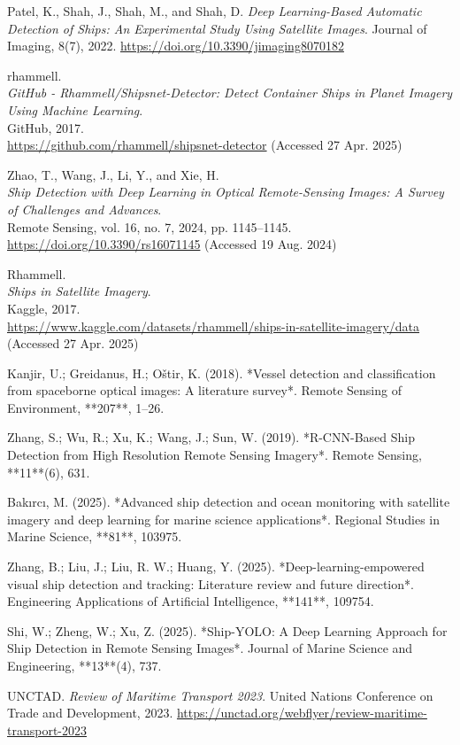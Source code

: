\documentclass[11pt]{article}
\begin{document}
	\newpage
	\begin{flushleft}
		\begin{thebibliography}{9}
			Patel, K., Shah, J., Shah, M., and Shah, D.
			\textit{Deep Learning-Based Automatic Detection of Ships: An Experimental Study Using Satellite Images}.
			Journal of Imaging, 8(7), 2022.
			\url{https://doi.org/10.3390/jimaging8070182}
			
			rhammell.\\
			\textit{GitHub - Rhammell/Shipsnet-Detector: Detect Container Ships in Planet Imagery Using Machine Learning}.\\
			GitHub, 2017.\\
			\url{https://github.com/rhammell/shipsnet-detector} (Accessed 27 Apr. 2025)
			
			Zhao, T., Wang, J., Li, Y., and Xie, H.\\
			\textit{Ship Detection with Deep Learning in Optical Remote-Sensing Images: A Survey of Challenges and Advances}.\\
			Remote Sensing, vol. 16, no. 7, 2024, pp. 1145--1145.\\
			\url{https://doi.org/10.3390/rs16071145} (Accessed 19 Aug. 2024)
			
			Rhammell.\\
			\textit{Ships in Satellite Imagery}.\\
			Kaggle, 2017.\\
			\url{https://www.kaggle.com/datasets/rhammell/ships-in-satellite-imagery/data} (Accessed 27 Apr. 2025)
			
			 Kanjir, U.; Greidanus, H.; Oštir, K. (2018). *Vessel detection and classification from spaceborne optical images: A literature survey*. Remote Sensing of Environment, **207**, 1–26.
			
			 Zhang, S.; Wu, R.; Xu, K.; Wang, J.; Sun, W. (2019). *R-CNN-Based Ship Detection from High Resolution Remote Sensing Imagery*. Remote Sensing, **11**(6), 631.
			
			 Bakırcı, M. (2025). *Advanced ship detection and ocean monitoring with satellite imagery and deep learning for marine science applications*. Regional Studies in Marine Science, **81**, 103975.
			
			 Zhang, B.; Liu, J.; Liu, R. W.; Huang, Y. (2025). *Deep-learning-empowered visual ship detection and tracking: Literature review and future direction*. Engineering Applications of Artificial Intelligence, **141**, 109754.
			
			 Shi, W.; Zheng, W.; Xu, Z. (2025). *Ship-YOLO: A Deep Learning Approach for Ship Detection in Remote Sensing Images*. Journal of Marine Science and Engineering, **13**(4), 737.
			
			UNCTAD. \textit{Review of Maritime Transport 2023}. United Nations Conference on Trade and Development, 2023. \url{https://unctad.org/webflyer/review-maritime-transport-2023}
		\end{thebibliography}
	\end{flushleft}
\end{document}

